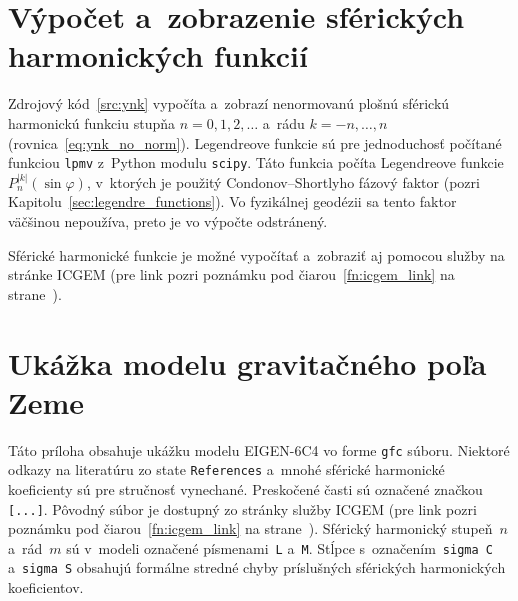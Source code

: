 \documentclass[a4paper, 12pt]{book}
\begin{document}
\chapter{Výpočet a~zobrazenie sférických harmonických funkcií}
\label{app:sh}

Zdrojový kód~\ref{src:ynk} vypočíta a~zobrazí nenormovanú plošnú sférickú
harmonickú funkciu stupňa $n = 0, 1, 2, \dots$ a~rádu $k = -n, \dots, n$
(rovnica~\ref{eq:ynk_no_norm}).  Legendreove funkcie sú pre jednoduchosť
počítané funkciou \texttt{lpmv} z~Python modulu \texttt{scipy}.  Táto funkcia
počíta Legendreove funkcie $P_n^{|k|}(\sin\varphi)$, v~ktorých je
použitý Condonov--Shortlyho fázový faktor (pozri 
Kapitolu~\ref{sec:legendre_functions}).  Vo fyzikálnej geodézii sa tento faktor 
väčšinou nepoužíva, preto je vo výpočte odstránený.

Sférické harmonické funkcie je možné vypočítať a~zobraziť aj pomocou služby na 
stránke ICGEM (pre link pozri poznámku pod čiarou~\ref{fn:icgem_link} na 
strane~\pageref{fn:icgem_link}).

\vspace{4ex}








\chapter{Ukážka modelu gravitačného poľa Zeme}
\label{app:gfc_file}

Táto príloha obsahuje ukážku modelu EIGEN-6C4 vo forme \texttt{gfc} súboru.  
Niektoré odkazy na literatúru zo state \texttt{References} a~mnohé sférické 
harmonické koeficienty sú pre stručnosť vynechané.  Preskočené časti sú 
označené značkou \texttt{[...]}.  Pôvodný súbor je dostupný zo stránky služby 
ICGEM (pre link pozri poznámku pod čiarou~\ref{fn:icgem_link} na 
strane~\pageref{fn:icgem_link}).  Sférický harmonický stupeň~$n$ a~rád~$m$ sú 
v~modeli označené písmenami~\texttt{L} a~\texttt{M}.  Stĺpce 
s~označením~\texttt{sigma C} a~\texttt{sigma S} obsahujú formálne stredné chyby 
príslušných sférických harmonických koeficientov.

\vspace{10ex}
\footnotesize
\end{document}
